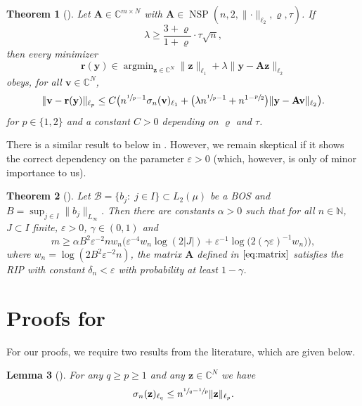 \documentclass[11pt,reqno, a4paper]{article}
\numberwithin{equation}{section}
\newtheorem{theorem}{Theorem}[section]
\newtheorem{lemma}[theorem]{Lemma}
\newcommand{\C}{\mathbb{C}}
\DeclareMathOperator*{\argmin}{argmin}
\begin{document}
\begin{theorem}[{\cite[Thm.\ 6.29]{AdcockBrugWebster22}}]\label{thm:LassoNSP}
Let $\mathbf{A}\in\mathbb{C}^{m\times N}$ with $\mathbf{A}\in\operatorname{NSP}(n,2,\lVert\cdot\rVert_{\ell_2},\varrho,\tau)$. If
\begin{equation}
    \lambda\geq \frac{3+\varrho}{1+\varrho}\cdot\tau\sqrt{n},
\end{equation}
then every minimizer
\begin{equation}\label{eq:lambdaLowerBound}
    \mathbf{r(\mathbf{y})} \in \argmin_{\mathbf{z}\in\mathbb{C}^N}\lVert\mathbf{z}\rVert_{\ell_1}+\lambda\lVert\mathbf{y}-\mathbf{A}\mathbf{z}\rVert_{\ell_2}
\end{equation}
obeys, for all $\mathbf{v}\in\mathbb{C}^N$,
\begin{equation}\label{eq:LassoNSP}
    \lVert\mathbf{v}-\mathbf{r}(\mathbf{y})\rVert_{\ell_p}\leq C\bigl(n^{\sfrac{1}{p}-1}\sigma_n(\mathbf{v})_{\ell_1} + \bigl(\lambda n^{\sfrac{1}{p}-1}+n^{1-\sfrac{p}{2}}\bigr)\lVert\mathbf{y}-\mathbf{A}\mathbf{v}\rVert_{\ell_2}\bigr).
\end{equation}
for $p\in\{1,2\}$ and a constant $C>0$ depending on $\varrho$ and $\tau$.
\end{theorem}

There is a similar result to  below in \cite[Thm.\ 2.3]{BDJR21}. 
However, we remain skeptical if it shows the correct dependency on the parameter $\varepsilon>0$ (which, however, is only of minor importance to us). 

\begin{theorem}[{\cite[Thm.\ 6.15]{AdcockBrugWebster22}}]\label{thm:RIP}
    Let $\mathcal{B}=\{b_j\colon \; j\in I\}\subset L_2(\mu)$ be a BOS and $B=\sup_{j\in I}\lVert b_j\rVert_{L_\infty}$.
    Then there are constants $\alpha>0$ such that for all $n\in\mathbb{N}$, $J\subset I$ finite, $\varepsilon>0$, $\gamma\in(0,1)$ and
    \begin{equation}
        m\geq \alpha B^2\varepsilon^{-2}n w_n\bigl(\varepsilon^{-4}w_n\log(2\lvert J\rvert)+ \varepsilon^{-1}\log\bigl(2(\gamma\varepsilon)^{-1}w_n\bigr)\bigr),
    \end{equation}
    where $w_n = \log(2B^2\varepsilon^{-2}n)$, the matrix $\mathbf{A}$ defined in $\eqref{eq:matrix}$ satisfies the RIP with constant $\delta_{n}<\varepsilon$ with probability at least $1-\gamma$.
\end{theorem}

\section[Proofs for Section 3]{Proofs for }\label{sec:ProofsInstance}
For our proofs, we require two results from the literature, which are given below.
\begin{lemma}[{\cite[Lem.\ 7.4.1]{DTU18}}]\label{thm:Stechkin}
For any $q\geq p\geq1$ and any $\mathbf{z}\in\C^N$ we have
\begin{equation}
    \sigma_n(\mathbf{z})_{\ell_q}\leq n^{\sfrac{1}{q}-\sfrac{1}{p}}\lVert \mathbf{z} \rVert_{\ell_p}.
\end{equation}
\end{lemma}
\end{document}
